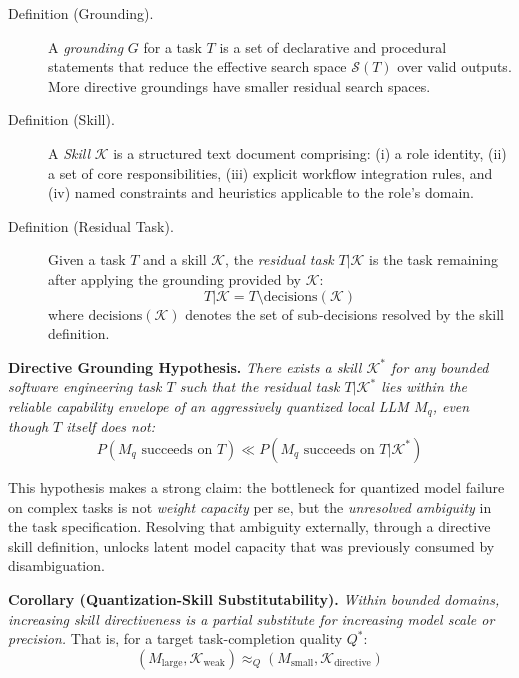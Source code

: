 \documentclass[11pt,a4paper]{article}
\begin{document}
\begin{description}
  \item[Definition (Grounding).] A \emph{grounding} $G$ for a task $T$ is a
  set of declarative and procedural statements that reduce the effective
  search space $\mathcal{S}(T)$ over valid outputs. More directive groundings
  have smaller residual search spaces.

  \item[Definition (Skill).] A \emph{Skill} $\mathcal{K}$ is a structured
  text document comprising: (i) a role identity, (ii) a set of core
  responsibilities, (iii) explicit workflow integration rules, and (iv) named
  constraints and heuristics applicable to the role's domain.

  \item[Definition (Residual Task).] Given a task $T$ and a skill
  $\mathcal{K}$, the \emph{residual task} $T | \mathcal{K}$ is the task
  remaining after applying the grounding provided by $\mathcal{K}$:
  \[
    T | \mathcal{K} = T \setminus \text{decisions}(\mathcal{K})
  \]
  where $\text{decisions}(\mathcal{K})$ denotes the set of sub-decisions
  resolved by the skill definition.
\end{description}

\vspace{0.5em}
\noindent\textbf{Directive Grounding Hypothesis.} \textit{There exists a skill
$\mathcal{K}^*$ for any bounded software engineering task $T$ such that the
residual task $T | \mathcal{K}^*$ lies within the reliable capability envelope
of an aggressively quantized local LLM $M_q$, even though $T$ itself does not:}
\[
  P(M_q \text{ succeeds on } T) \ll P(M_q \text{ succeeds on } T | \mathcal{K}^*)
\]

This hypothesis makes a strong claim: the bottleneck for quantized model
failure on complex tasks is not \emph{weight capacity} per se, but the
\emph{unresolved ambiguity} in the task specification. Resolving that
ambiguity externally, through a directive skill definition, unlocks latent
model capacity that was previously consumed by disambiguation.

\vspace{0.5em}
\noindent\textbf{Corollary (Quantization-Skill Substitutability).}
\textit{Within bounded domains, increasing skill directiveness is a
partial substitute for increasing model scale or precision.} That is, for
a target task-completion quality $Q^*$:
\[
  (M_{\text{large}}, \mathcal{K}_{\text{weak}}) \approx_Q
  (M_{\text{small}}, \mathcal{K}_{\text{directive}})
\]
\end{document}
